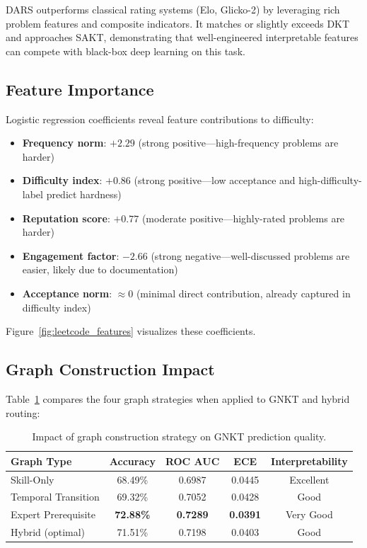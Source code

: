 \documentclass[conference]{IEEEtran}
\begin{document}
DARS outperforms classical rating systems (Elo, Glicko-2) by leveraging rich problem features and composite indicators. It matches or slightly exceeds DKT and approaches SAKT, demonstrating that well-engineered interpretable features can compete with black-box deep learning on this task.

\subsection{Feature Importance}
Logistic regression coefficients reveal feature contributions to difficulty:
\begin{itemize}
    \item \textbf{Frequency norm}: $+2.29$ (strong positive—high-frequency problems are harder)
    \item \textbf{Difficulty index}: $+0.86$ (strong positive—low acceptance and high-difficulty-label predict hardness)
    \item \textbf{Reputation score}: $+0.77$ (moderate positive—highly-rated problems are harder)
    \item \textbf{Engagement factor}: $-2.66$ (strong negative—well-discussed problems are easier, likely due to documentation)
    \item \textbf{Acceptance norm}: $\approx 0$ (minimal direct contribution, already captured in difficulty index)
\end{itemize}

Figure~\ref{fig:leetcode_features} visualizes these coefficients.

\subsection{Graph Construction Impact}
Table~\ref{tab:graph_results} compares the four graph strategies when applied to GNKT and hybrid routing:

\begin{table}[t]
\caption{Impact of graph construction strategy on GNKT prediction quality.}
\label{tab:graph_results}
\centering
\begin{tabular}{lcccc}
\toprule
\textbf{Graph Type} & \textbf{Accuracy} & \textbf{ROC AUC} & \textbf{ECE} & \textbf{Interpretability} \\
\midrule
Skill-Only & 68.49\% & 0.6987 & 0.0445 & Excellent \\
Temporal Transition & 69.32\% & 0.7052 & 0.0428 & Good \\
Expert Prerequisite & \textbf{72.88\%} & \textbf{0.7289} & \textbf{0.0391} & Very Good \\
Hybrid (optimal) & 71.51\% & 0.7198 & 0.0403 & Good \\
\bottomrule
\end{tabular}
\end{table}
\end{document}
